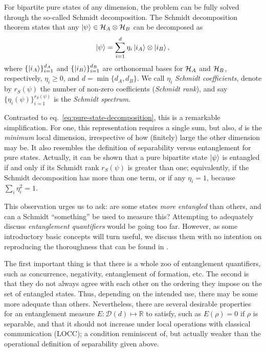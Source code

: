 		For bipartite pure states of any dimension, the problem can be fully solved through the so-called Schmidt decomposition. The Schmidt decomposition theorem states that any $\ket{\psi} \in \mathcal{H}_A \otimes \mathcal{H}_B$ can be decomposed as
		\begin{equation}
			\ket{\psi} = \sum_{i=1}^d \eta_i \ket{i_A} \otimes \ket{i_B} ,
			\label{eq:schmidt-decomposition}
		\end{equation}
		where $\{ \ket{i_A} \}_{i=1}^{d_A}$ and $\{ \ket{i_B} \}_{i=1}^{d_B}$ are orthonormal bases for $\mathcal{H}_A$ and $\mathcal{H}_B$, respectively, $\eta_i \geq 0$, and $d = \min \{d_A, d_B\}$. We call $\eta_i$ \emph{Schmidt coefficients}, denote by $r_S(\psi)$ the number of non-zero coefficients (\emph{Schmidt rank}), and say $\{ \eta_i (\psi) \}_{i=1}^{r_S(\psi)}$ is the \emph{Schmidt spectrum}.
	
		Contrasted to eq.~\eqref{eq:pure-state-decomposition}, this is a remarkable simplification. For one, this representation requires a single sum, but also, $d$ is the \emph{minimum} local dimension, irrespective of how (finitely) large the other dimension may be. It also resembles the definition of separability versus entanglement for pure states. Actually, it can be shown that a pure bipartite state $\ket{\psi}$ is entangled if and only if its Schmidt rank $r_S(\psi)$ is greater than one; equivalently, if the Schmidt decomposition has more than one term, or if any $\eta_i = 1$, because $\sum_i \eta_i^2 = 1$.
	
		This observation urges us to ask: are some states \emph{more entangled} than others, and can a Schmidt ``something'' be used to measure this? Attempting to adequately discuss \emph{entanglement quantifiers} would be going too far. However, as some introductory basic concepts will turn useful, we discuss them with no intention on reproducing the thoroughness that can be found in \cite{plenio_2007_entanglementmeasures,terra_tese,horodecki_2009_entanglement,dagmar_2002_entanglement}.
	
		The first important thing is that there is a whole zoo of entanglement quantifiers, such as concurrence, negativity, entanglement of formation, etc. The second is that they do not always agree with each other on the ordering they impose on the set of entangled states. Thus, depending on the intended use, there may be some more adequate than others. Nevertheless, there are several desirable properties for an entanglement measure $E : \mathcal{D}(d) \mapsto \mathbb{R}$ to satisfy, such as $E(\rho) = 0$ if $\rho$ is separable, and that it should not increase under local operations with classical communication (LOCC); a condition reminiscent of, but actually weaker than the operational definition of separability given above.
	
